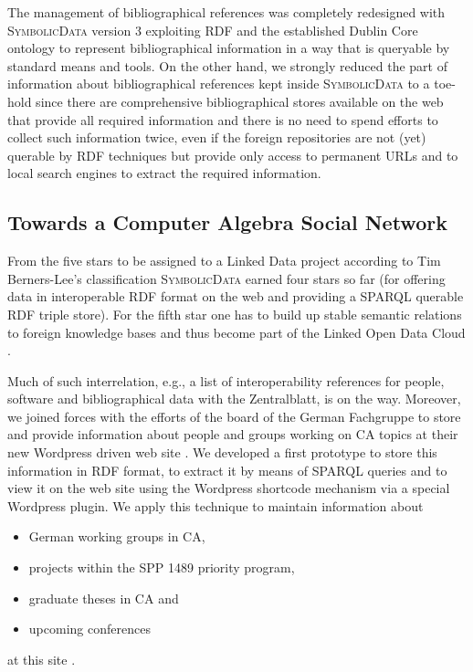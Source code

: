 \documentclass{svmult}
\newcommand{\SD}{\textsc{Symbolic\-Data}}
\begin{document}
The management of bibliographical references was completely redesigned with
{\SD} version 3 exploiting RDF and the established Dublin Core ontology
\cite{dcterms} to represent bibliographical information in a way that is
queryable by standard means and tools. On the other hand, we strongly reduced
the part of information about bibliographical references kept inside {\SD} to
a toe-hold since there are comprehensive bibliographical stores available on
the web that provide all required information and there is no need to spend
efforts to collect such information twice, even if the foreign repositories
are not (yet) querable by RDF techniques but provide only access to permanent
URLs and to local search engines to extract the required information. 

\subsection{Towards a Computer Algebra Social Network}

From the five stars to be assigned to a Linked Data project according to Tim
Berners-Lee's classification \cite{5stars} {\SD} earned four stars so far (for
offering data in interoperable RDF format on the web and providing a SPARQL
querable RDF triple store).  For the fifth star one has to build up stable
semantic relations to foreign knowledge bases and thus become part of the
Linked Open Data Cloud \cite{lod}.

Much of such interrelation, e.g., a list of interoperability references for
people, software and bibliographical data with the Zentralblatt, is on the
way.  Moreover, we joined forces with the efforts of the board of the German
Fachgruppe to store and provide information about people and groups working on
CA topics at their new Wordpress driven web site \cite{cafg}.  We developed a
first prototype \cite{sdcasn} to store this information in RDF format, to
extract it by means of SPARQL queries and to view it on the web site using the
Wordpress shortcode mechanism via a special Wordpress plugin.  We apply this
technique to maintain information about
\begin{itemize}
\item German working groups in CA,
\item projects within the SPP 1489 priority program,
\item graduate theses in CA and
\item upcoming conferences
\end{itemize}
at this site \cite{cafg}.  
\end{document}
